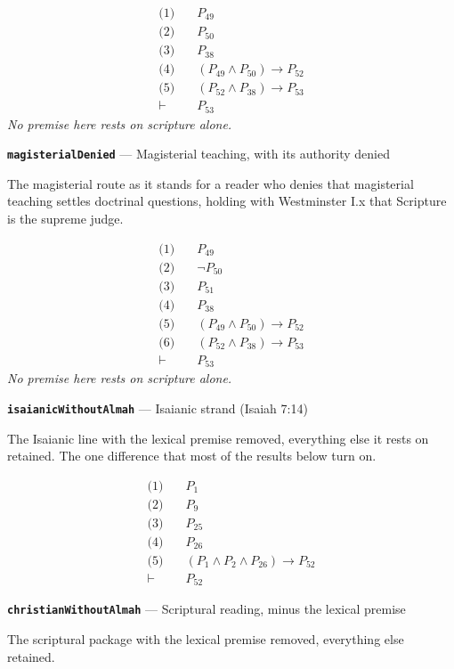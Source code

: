 \documentclass[11pt]{article}
\begin{document}
\begin{align*}
  \text{(1)} \quad & P_{49} \\
  \text{(2)} \quad & P_{50} \\
  \text{(3)} \quad & P_{38} \\
  \text{(4)} \quad & (P_{49} \land P_{50}) \rightarrow P_{52} \\
  \text{(5)} \quad & (P_{52} \land P_{38}) \rightarrow P_{53} \\
  \vdash \quad & P_{53}
\end{align*}
\emph{No premise here rests on scripture alone.}
\par\medskip\noindent\textbf{\texttt{magisterial\allowbreak{}Denied}} --- Magisterial teaching, with its authority denied\par\nobreak\noindent
The magisterial route as it stands for a reader who denies that magisterial teaching settles doctrinal questions, holding with Westminster I.x that Scripture is the supreme judge.

\begin{align*}
  \text{(1)} \quad & P_{49} \\
  \text{(2)} \quad & \lnot P_{50} \\
  \text{(3)} \quad & P_{51} \\
  \text{(4)} \quad & P_{38} \\
  \text{(5)} \quad & (P_{49} \land P_{50}) \rightarrow P_{52} \\
  \text{(6)} \quad & (P_{52} \land P_{38}) \rightarrow P_{53} \\
  \vdash \quad & P_{53}
\end{align*}
\emph{No premise here rests on scripture alone.}
\par\medskip\noindent\textbf{\texttt{isaianic\allowbreak{}Without\allowbreak{}Almah}} --- Isaianic strand (Isaiah 7:14)\par\nobreak\noindent
The Isaianic line with the lexical premise removed, everything else it rests on retained. The one difference that most of the results below turn on.

\begin{align*}
  \text{(1)} \quad & P_{1} \\
  \text{(2)} \quad & P_{9} \\
  \text{(3)} \quad & P_{25} \\
  \text{(4)} \quad & P_{26} \\
  \text{(5)} \quad & (P_{1} \land P_{2} \land P_{26}) \rightarrow P_{52} \\
  \vdash \quad & P_{52}
\end{align*}
\par\medskip\noindent\textbf{\texttt{christian\allowbreak{}Without\allowbreak{}Almah}} --- Scriptural reading, minus the lexical premise\par\nobreak\noindent
The scriptural package with the lexical premise removed, everything else retained.
\end{document}
